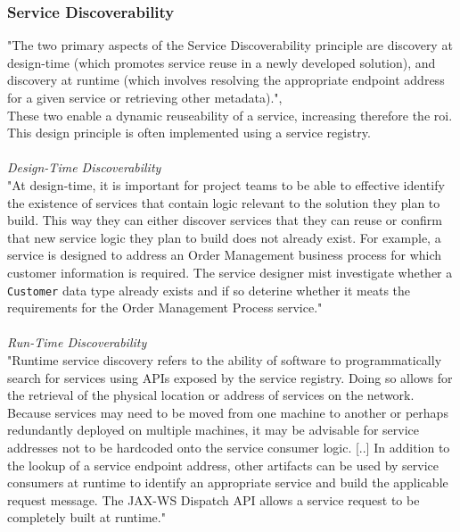 \documentclass[12pt]{article}
\begin{document}
\subsubsection{Service Discoverability}
\label{sec:disc}
"The two primary aspects of the Service Discoverability principle are discovery at design-time (which promotes service reuse in a newly developed solution), and discovery at runtime (which involves resolving the appropriate endpoint address for a given service or retrieving other metadata).", \cite[page 204]{grau}\\These two enable a dynamic reuseability of a service, increasing therefore the \gls{roi}. This design principle is often implemented using a service registry. \cite[page 89]{te} \\\\
\noindent\textit{Design-Time Discoverability}\\
"At design-time, it is important for project teams to be able to effective identify the existence of services that contain logic relevant to the solution they plan to build. This way they can either discover services that they can reuse or confirm that new service logic they plan to build does not already exist. For example, a service is designed to address an Order Management business process for which customer information is required. The service designer mist investigate whether a \texttt{Customer} data type already exists and if so deterine whether it meats the requirements for the Order Management Process service." \cite[page 204-205]{grau}\\\\
\textit{Run-Time Discoverability}\\
"Runtime service discovery refers to the ability of software to programmatically search for services using APIs exposed by the service registry. Doing so allows for the retrieval of the physical location or address of services on the network. Because services may need to be moved from one machine to another or perhaps redundantly deployed on multiple machines, it may be advisable for service addresses not to be hardcoded onto the service consumer logic. [..] In addition to the lookup of a service endpoint address, other artifacts can be used by service consumers at runtime to identify an appropriate service and build the applicable request message. The JAX-WS Dispatch API allows a service request to be completely built at runtime."\cite[page 205-207]{grau}
\end{document}
